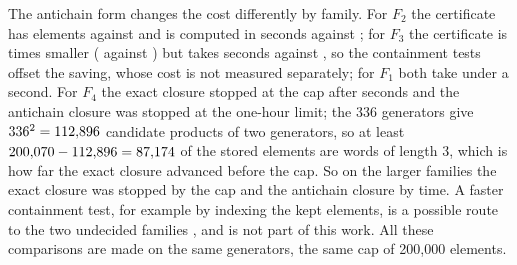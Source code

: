 The antichain form changes the cost differently by family. For $F_2$ the certificate has \nCertFtwo{} elements against \nElemFtwo{} and is computed in \nTimeCertFtwo{} seconds against \nTimeExactFtwo{}; for
$F_3$ the certificate is \nRatioFthree{} times smaller (\nCertFthree{} against \nElemFthree{}) but takes \nTimeCertFthree{} seconds against \nTimeExactFthree{}, so the containment tests offset the saving, whose cost is not measured separately; for $F_1$ both take under a second. For $F_4$ the exact closure stopped at the cap after \nTimeFfour{} seconds and the antichain closure was stopped at the one-hour limit; the 336 generators give $336^2 = 112{,}896$ candidate products of two generators, so at least $200{,}070 - 112{,}896 = 87{,}174$ of the stored elements are words of length 3, which is how far the exact closure advanced before the cap. So on the
larger families the exact closure was stopped by the cap and the antichain closure by time. A faster containment test, for example by indexing the kept elements,
is a possible route to the two undecided families , and is not part of this work. All these comparisons are made on the same generators, the same cap of 200{,}000 elements.
